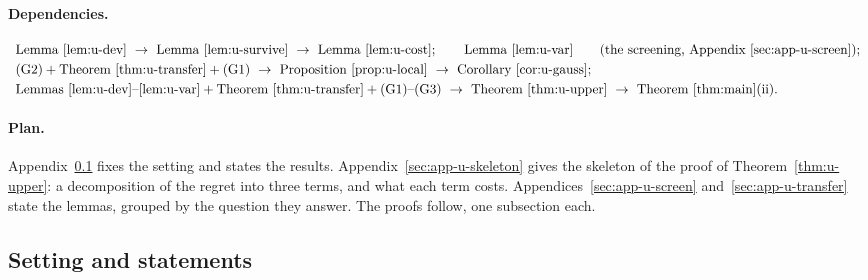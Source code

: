 \documentclass[11pt]{article}
\newcommand{\1}{\mathbf{1}}
\begin{document}
\paragraph{Dependencies.}
\[
\begin{array}{l}
\text{Lemma~\ref{lem:u-dev}}\ \to\ \text{Lemma~\ref{lem:u-survive}}\ \to\ \text{Lemma~\ref{lem:u-cost}};\qquad\text{Lemma~\ref{lem:u-var}}
\qquad\text{(the screening, Appendix~\ref{sec:app-u-screen})};\\[1mm]
\text{(G2)}+\text{Theorem~\ref{thm:u-transfer}}+\text{(G1)}\ \to\ \text{Proposition~\ref{prop:u-local}}\ \to\ \text{Corollary~\ref{cor:u-gauss}};\\[1mm]
\text{Lemmas~\ref{lem:u-dev}--\ref{lem:u-var}}+\text{Theorem~\ref{thm:u-transfer}}+\text{(G1)--(G3)}\ \to\ \text{Theorem~\ref{thm:u-upper}}\ \to\
\text{Theorem~\ref{thm:main}(ii)}.
\end{array}
\]

\paragraph{Plan.} Appendix~\ref{sec:app-u-setting} fixes the setting and states the results. Appendix~\ref{sec:app-u-skeleton} gives the skeleton of the proof of
Theorem~\ref{thm:u-upper}: a decomposition of the regret into three terms, and what each term costs. Appendices~\ref{sec:app-u-screen} and~\ref{sec:app-u-transfer}
state the lemmas, grouped by the question they answer. The proofs follow, one subsection each.

\subsection{Setting and statements}\label{sec:app-u-setting}
\end{document}
